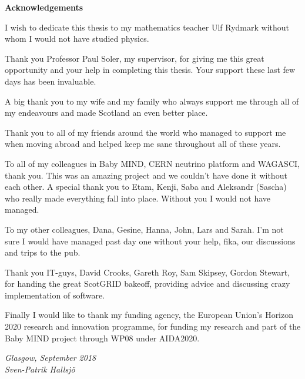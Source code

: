 \vspace*{0.75in}

\begin{center} {\bf Acknowledgements}\end{center}

I wish to dedicate this thesis to my mathematics teacher Ulf Rydmark without whom I would not have studied physics.

Thank you Professor Paul Soler, my supervisor, for giving me this great opportunity and your help in completing this thesis. Your support these last few days has been invaluable.

A big thank you to my wife and my family who always support me through all of my endeavours and made Scotland an even better place.

Thank you to all of my friends around the world who managed to support me when moving abroad and helped keep me sane throughout all of these years. 

To all of my colleagues in Baby MIND, CERN neutrino platform and WAGASCI, thank you. This was an amazing project and we couldn't have done it without each other. A special thank you to Etam, Kenji, Saba and Aleksandr (Sascha) who really made everything fall into place. Without you I would not have managed.

To my other colleagues, Dana, Gesine, Hanna, John, Lars and Sarah. I'm not sure I would have managed past day one without your help, fika, our discussions and trips to the pub.

Thank you IT-guys, David Crooks, Gareth Roy, Sam Skipsey, Gordon Stewart, for handing the great ScotGRID bakeoff, providing advice and discussing crazy implementation of software.

Finally I would like to thank my funding agency, the European Union's Horizon 2020 research and innovation programme, for funding my research and part of the Baby MIND project through WP08 under AIDA2020. 

\begin{flushright} \textit{Glasgow, September 2018 \\ Sven-Patrik Hallsj{\"o}}\end{flushright}




